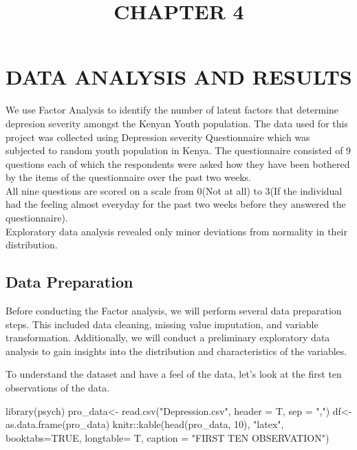 \documentclass[
]{article}
\title{CHAPTER 4}
\author{}
\date{\vspace{-2.5em}}
\newenvironment{Shaded}{\begin{snugshade}}{\end{snugshade}}
\newcommand{\AttributeTok}[1]{\textcolor[rgb]{0.77,0.63,0.00}{#1}}
\newcommand{\ConstantTok}[1]{\textcolor[rgb]{0.00,0.00,0.00}{#1}}
\newcommand{\DecValTok}[1]{\textcolor[rgb]{0.00,0.00,0.81}{#1}}
\newcommand{\FunctionTok}[1]{\textcolor[rgb]{0.00,0.00,0.00}{#1}}
\newcommand{\NormalTok}[1]{#1}
\newcommand{\OtherTok}[1]{\textcolor[rgb]{0.56,0.35,0.01}{#1}}
\newcommand{\SpecialCharTok}[1]{\textcolor[rgb]{0.00,0.00,0.00}{#1}}
\newcommand{\StringTok}[1]{\textcolor[rgb]{0.31,0.60,0.02}{#1}}
\begin{document}
\maketitle

\hypertarget{data-analysis-and-results}{%
\section{DATA ANALYSIS AND RESULTS}\label{data-analysis-and-results}}

We use Factor Analysis to identify the number of latent factors that
determine depresion severity amongst the Kenyan Youth population. The
data used for this project was collected using Depression severity
Questionnaire which was subjected to random youth population in Kenya.
The questionnaire consisted of 9 questions each of which the respondents
were asked how they have been bothered by the items of the questionnaire
over the past two weeks.\\
All nine questions are scored on a scale from 0(Not at all) to 3(If the individual had the feeling almost everyday for the past two weeks before they answered the
questionnaire).\\
Exploratory data analysis revealed only minor deviations from normality in their distribution.

\hypertarget{data-preparation}{%
\subsection{Data Preparation}\label{data-preparation}}

Before conducting the Factor analysis, we will perform several data
preparation steps. This included data cleaning, missing value
imputation, and variable transformation. Additionally, we will conduct a
preliminary exploratory data analysis to gain insights into the
distribution and characteristics of the variables.

To understand the dataset and have a feel of the data, let's look at the
first ten observations of the data.

\begin{Shaded}
\begin{Highlighting}[]
\FunctionTok{library}\NormalTok{(psych)}
\NormalTok{pro\_data}\OtherTok{\textless{}{-}} \FunctionTok{read.csv}\NormalTok{(}\StringTok{"Depression.csv"}\NormalTok{, }\AttributeTok{header =}\NormalTok{ T, }\AttributeTok{sep =} \StringTok{","}\NormalTok{)}
\NormalTok{df}\OtherTok{\textless{}{-}} \FunctionTok{as.data.frame}\NormalTok{(pro\_data)}
\NormalTok{knitr}\SpecialCharTok{::}\FunctionTok{kable}\NormalTok{(}\FunctionTok{head}\NormalTok{(pro\_data, }\DecValTok{10}\NormalTok{), }\StringTok{"latex"}\NormalTok{, }\AttributeTok{booktabs=}\ConstantTok{TRUE}\NormalTok{, }\AttributeTok{longtable=}\NormalTok{ T, }
             \AttributeTok{caption =} \StringTok{"FIRST TEN OBSERVATION"}\NormalTok{)}
\end{Highlighting}
\end{Shaded}
\end{document}
